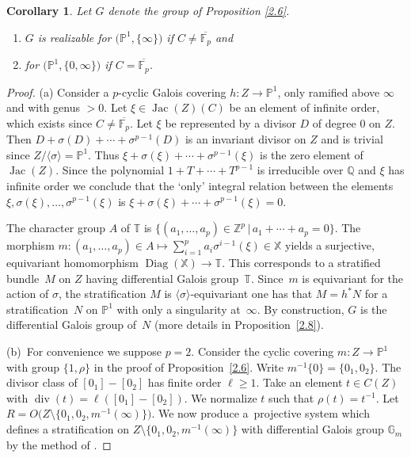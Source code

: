 \documentclass[pdftex]{sigma}
\numberwithin{equation}{section}
\newtheorem{Corollary}[Theorem]{Corollary}
\begin{document}
\begin{Corollary}\label{2.7} Let $G$ denote the group of Proposition {\rm \ref{2.6}}.
\begin{enumerate}\itemsep=0pt
\item[$(a)$] $G$ is realizable for $\big(\mathbb{P}^1,\{\infty \}\big)$ if $C\neq \overline{\mathbb{F}_p}$ and
\item[$(b)$] for $\big(\mathbb{P}^1,\{0, \infty \}\big)$ if $C=\overline{\mathbb{F}_p}$.
\end{enumerate}
 \end{Corollary}
\begin{proof} (a) Consider a $p$-cyclic Galois covering $h\colon Z\rightarrow \mathbb{P}^1$, only ramified above $\infty$ and with genus $>0$. Let $\xi \in \operatorname{Jac}(Z)(C)$ be an element of infinite
order, which exists since $C\neq \overline{\mathbb{F}_p}$. Let $\xi$ be represented by a divisor
$D$ of degree 0 on $Z$. Then $D+\sigma (D)+\cdots +\sigma^{p-1}(D)$ is an invariant divisor
on $Z$ and is trivial since $Z/\langle \sigma \rangle=\mathbb{P}^1$. Thus
$\xi+\sigma (\xi)+\cdots +\sigma^{p-1}(\xi)$ is the zero element of $\operatorname{Jac}(Z)$.
 Since the polynomial $1+T+\cdots +T^{p-1}$ is irreducible over $\mathbb{Q}$ and $\xi$
 has infinite order we conclude that the `only' integral relation between the elements $\xi, \sigma (\xi),\dots ,\sigma^{p-1}(\xi)$ is $\xi+\sigma (\xi)+\cdots +\sigma^{p-1}(\xi)=0$.

The character group $A$ of $\mathbb{T}$ is $\{(a_1,\dots ,a_p) \in \mathbb{Z}^p\, | \, a_1+\cdots +a_p=0\}$. The morphism $m\colon (a_1,\dots ,a_p)\in A\mapsto \sum\limits_{i=1}^pa_i\sigma^{i-1}(\xi)\in \mathbb{X}$ yields a surjective, equivariant homomorphism $\operatorname{Diag}(\mathbb{X})\allowbreak \rightarrow \mathbb{T}$. This corresponds to a stratified bundle~$M$ on $Z$ having differential Galois group~$\mathbb{T}$. Since~$m$ is equivariant for the action of $\sigma$, the stratification $M$ is $\langle \sigma \rangle$-equivariant one has that $M=h^*N$ for a stratification~$N$ on $\mathbb{P}^1$ with only a singularity at~$\infty$. By construction, $G$ is the differential Galois group of~$N$ (more details in Proposition~\ref{2.8}).

(b)~For convenience we suppose $p=2$. Consider the cyclic covering $m\colon Z\rightarrow \mathbb{P}^1$ with group $\{1,\rho \}$ in the proof of Proposition~\ref{2.6}. Write
 $m^{-1}\{0\}=\{0_1,0_2\}$. The divisor class of $[0_1]-[0_2]$ has finite order $\ell \geq 1$. Take an element $t\in C(Z)$ with $\operatorname{div}(t)=\ell ([0_1]-[0_2])$. We normalize $t$ such that $\rho (t)=t^{-1}$. Let $R=O\big(Z\setminus \big\{0_1,0_2,m^{-1}(\infty )\big\}\big)$. We now produce a~projective system which defines a stratification on $Z\setminus \big\{0_1,0_2,m^{-1}(\infty )\big\}$ with differential Galois group $\mathbb{G}_m$ by the method of \cite[Theorem~7.3, Lemma~7.4]{Ma-vdP1}.


\end{proof}
\end{document}
